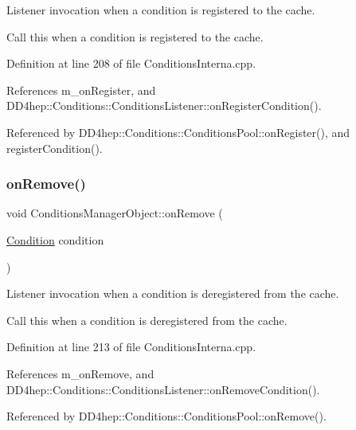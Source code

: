 Listener invocation when a condition is registered to the cache. 

Call this when a condition is registered to the cache. 

Definition at line 208 of file Conditions\+Interna.\+cpp.



References m\+\_\+on\+Register, and D\+D4hep\+::\+Conditions\+::\+Conditions\+Listener\+::on\+Register\+Condition().



Referenced by D\+D4hep\+::\+Conditions\+::\+Conditions\+Pool\+::on\+Register(), and register\+Condition().

\hypertarget{class_d_d4hep_1_1_conditions_1_1_conditions_manager_object_adb550d80aca3b897f299530b4c4bfd0b}{}\label{class_d_d4hep_1_1_conditions_1_1_conditions_manager_object_adb550d80aca3b897f299530b4c4bfd0b} 
\subsubsection{\texorpdfstring{on\+Remove()}{onRemove()}}
{\footnotesize\ttfamily void Conditions\+Manager\+Object\+::on\+Remove (\begin{DoxyParamCaption}\item[{\hyperlink{class_d_d4hep_1_1_conditions_1_1_condition}{Condition}}]{condition }\end{DoxyParamCaption})\hspace{0.3cm}{\ttfamily [protected]}}



Listener invocation when a condition is deregistered from the cache. 

Call this when a condition is deregistered from the cache. 

Definition at line 213 of file Conditions\+Interna.\+cpp.



References m\+\_\+on\+Remove, and D\+D4hep\+::\+Conditions\+::\+Conditions\+Listener\+::on\+Remove\+Condition().



Referenced by D\+D4hep\+::\+Conditions\+::\+Conditions\+Pool\+::on\+Remove().

\hypertarget{class_d_d4hep_1_1_conditions_1_1_conditions_manager_object_a897ca111b081fb1c6ed8a39739684d0e}{}\label{class_d_d4hep_1_1_conditions_1_1_conditions_manager_object_a897ca111b081fb1c6ed8a39739684d0e} 
